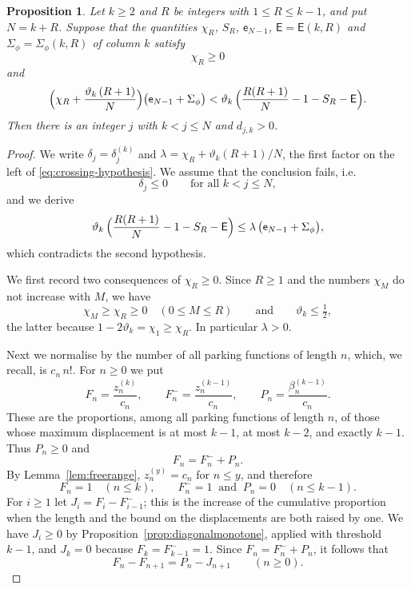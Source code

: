 \documentclass{amsart}
\newtheorem{proposition}[theorem]{Proposition}
\theoremstyle{definition}
\theoremstyle{remark}
\numberwithin{equation}{section}
\begin{document}
\begin{proposition}\label{prop:criterion}
Let $k\ge 2$ and $R$ be integers with $1\le R\le k-1$, and put $N=k+R$. Suppose that the quantities $\chi_R$, $S_R$, $\mathsf e_{N-1}$, $\mathsf E=\mathsf E(k,R)$ and $\Sigma_\phi=\Sigma_\phi(k,R)$ of column $k$ satisfy
\[
\chi_R\ge 0
\]
and
\begin{equation}\label{eq:crossing-hypothesis}
\Bigl(\chi_R+\frac{\vartheta_k\,(R+1)}{N}\Bigr)\bigl(\mathsf e_{N-1}+\Sigma_\phi\bigr)<\vartheta_k\,\Bigl(\frac{R(R+1)}{N}-1-S_R-\mathsf E\Bigr).
\end{equation}
Then there is an integer $j$ with $k<j\le N$ and $d_{j,k}>0$.
\end{proposition}

\begin{proof}
We write $\delta_j=\delta^{(k)}_j$ and $\lambda=\chi_R+\vartheta_k(R+1)/N$, the first factor on the left of \eqref{eq:crossing-hypothesis}. We assume that the conclusion fails, i.e.
\[
\delta_j\le 0\qquad\text{for all } k<j\le N,
\]
and we derive
\begin{equation}\label{eq:crossing-opposite}
\vartheta_k\,\Bigl(\frac{R(R+1)}{N}-1-S_R-\mathsf E\Bigr)\le\lambda\,\bigl(\mathsf e_{N-1}+\Sigma_\phi\bigr),
\end{equation}
which contradicts the second hypothesis.

We first record two consequences of $\chi_R\ge 0$. Since $R\ge 1$ and the numbers $\chi_M$ do not increase with $M$, we have
\[
\chi_M\ge\chi_R\ge 0\quad(0\le M\le R)\qquad\text{and}\qquad \vartheta_k\le\tfrac12 ,
\]
the latter because $1-2\vartheta_k=\chi_1\ge\chi_R$. In particular $\lambda>0$.

Next we normalise by the number of all parking functions of length $n$, which, we recall, is $c_n\,n!$. For $n\ge 0$ we put
\[
F_n=\frac{z^{(k)}_n}{c_n},\qquad F^-_n=\frac{z^{(k-1)}_n}{c_n},\qquad P_n=\frac{\beta^{(k-1)}_n}{c_n}.
\]
These are the proportions, among all parking functions of length $n$, of those whose maximum displacement is at most $k-1$, at most $k-2$, and exactly $k-1$. Thus $P_n\ge 0$ and
\[
F_n=F^-_n+P_n .
\]
By Lemma~\ref{lem:freerange}, $z^{(y)}_n=c_n$ for $n\le y$, and therefore
\[
F_n=1\quad(n\le k),\qquad F^-_n=1\ \text{ and }\ P_n=0\quad(n\le k-1).
\]
For $i\ge 1$ let $J_i=F_i-F^-_{i-1}$; this is the increase of the cumulative proportion when the length and the bound on the displacements are both raised by one. We have $J_i\ge 0$ by Proposition~\ref{prop:diagonalmonotone}, applied with threshold $k-1$, and $J_k=0$ because $F_k=F^-_{k-1}=1$. Since $F_n=F^-_n+P_n$, it follows that
\[
F_n-F_{n+1}=P_n-J_{n+1}\qquad(n\ge 0).
\]


\end{proof}
\end{document}
